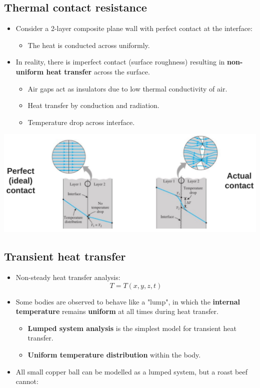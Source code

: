 \documentclass[11pt]{article}
\begin{document}
\subsection{Thermal contact resistance}
\label{sec:orgf882aff}
\begin{itemize}
\item Consider a 2-layer composite plane wall with perfect contact at the interface:
\begin{itemize}
\item The heat is conducted across uniformly.
\end{itemize}
\item In reality, there is imperfect contact (surface roughness) resulting in \textbf{non-uniform heat transfer} across the surface.
\begin{itemize}
\item Air gaps act as insulators due to low thermal conductivity of air.
\item Heat transfer by conduction and radiation.
\item Temperature drop across interface.
\end{itemize}
\end{itemize}
\begin{center}
\includegraphics[width=.9\linewidth]{./images/thermal-contact-resistance.png}
\end{center}
\subsection{Transient heat transfer}
\label{sec:org54cd082}
\begin{itemize}
\item Non-steady heat transfer analysis:
\[T = T(x, y, z, t)\]
\item Some bodies are observed to behave like a "lump", in which the \textbf{internal temperature} remains \textbf{uniform} at all times during heat transfer.
\begin{itemize}
\item \textbf{Lumped system analysis} is the simplest model for transient heat transfer.
\item \textbf{Uniform temperature distribution} within the body.
\end{itemize}
\item All small copper ball can be modelled as a lumped system, but a roast beef cannot:
\end{itemize}
\end{document}
